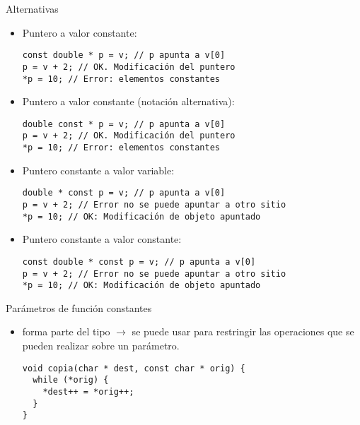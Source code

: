 \begin{frame}[t,fragile]{Alternativas}
\begin{itemize}
  \item Puntero a valor constante:
\begin{lstlisting}
const double * p = v; // p apunta a v[0]
p = v + 2; // OK. Modificación del puntero
*p = 10; // Error: elementos constantes
\end{lstlisting}

  \item Puntero a valor constante (notación alternativa):
\begin{lstlisting}
double const * p = v; // p apunta a v[0]
p = v + 2; // OK. Modificación del puntero
*p = 10; // Error: elementos constantes
\end{lstlisting}

  \item Puntero constante a valor variable:
\begin{lstlisting}
double * const p = v; // p apunta a v[0]
p = v + 2; // Error no se puede apuntar a otro sitio
*p = 10; // OK: Modificación de objeto apuntado
\end{lstlisting}

  \item Puntero constante a valor constante:
\begin{lstlisting}
const double * const p = v; // p apunta a v[0]
p = v + 2; // Error no se puede apuntar a otro sitio
*p = 10; // OK: Modificación de objeto apuntado
\end{lstlisting}
\end{itemize}
\end{frame}

\begin{frame}[t,fragile]{Parámetros de función constantes}
\begin{itemize}
  \item {} forma parte del tipo $\rightarrow$ se puede usar para restringir las operaciones que se
        pueden realizar sobre un parámetro.
\begin{lstlisting}
void copia(char * dest, const char * orig) {
  while (*orig) {
    *dest++ = *orig++;
  }
}
\end{lstlisting}
\end{itemize}
\end{frame}


